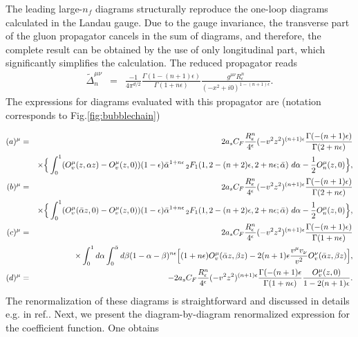 \documentclass[aps,prd,twocolumn,a4paper,superscriptaddress,10pt,showpacs,notitlepage,floatfix]{revtex4-1}
\begin{document}
The leading large-$n_f$ diagrams structurally reproduce the one-loop diagrams calculated in the Landau gauge. Due to the gauge invariance, the transverse part of the gluon propagator cancels in the sum of diagrams, and therefore, the complete result can be obtained by the use of only longitudinal part, which significantly simplifies the calculation. The reduced propagator reads
\begin{eqnarray}
\tilde \Delta_n^{\mu\nu}&=&\frac{-1}{4\pi^{d/2}}
\frac{\Gamma(1-(n+1)\epsilon)}{\Gamma(1+n\epsilon)}\frac{g^{\mu\nu} R_\epsilon^n}{(-x^2+i0)^{1-(n+1)\epsilon}}.
\end{eqnarray}
The expressions for diagrams evaluated with this propagator are (notation corresponds to Fig.\ref{fig:bubblechain})
\begin{widetext}
\begin{eqnarray}
(a)^\mu &=&2a_sC_F \frac{R_\epsilon^n}{4^\epsilon}(-v^2z^2)^{(n+1)\epsilon}\frac{\Gamma(-(n+1)\epsilon)}{\Gamma(2+n\epsilon)}
\\&& \nonumber \hfill
\times\Big\{\int_0^1  
(O_v^\mu(z,\alpha z)-O_v^\mu(z,0))(1-\epsilon)\bar \alpha^{1+n\epsilon}\,_2F_1(1,2-(n+2)\epsilon,2+n\epsilon;\bar \alpha)~d\alpha-\frac{1}{2}O^\mu_n(z,0)\Big\},
\\
(b)^\mu &=&2a_sC_F \frac{R_\epsilon^n}{4^\epsilon}(-v^2z^2)^{(n+1)\epsilon}\frac{\Gamma(-(n+1)\epsilon)}{\Gamma(2+n\epsilon)}
\\&& \nonumber \hfill
\times\Big\{\int_0^1  
(O_v^\mu(\bar \alpha z,0)-O_v^\mu(z,0))(1-\epsilon)\bar \alpha^{1+n\epsilon}\,_2F_1(1,2-(n+2)\epsilon,2+n\epsilon;\bar \alpha)~d\alpha-\frac{1}{2}O^\mu_n(z,0)\Big\},
\\
(c)^\mu &=&2a_sC_F \frac{R_\epsilon^n}{4^\epsilon}(-v^2z^2)^{(n+1)\epsilon}\frac{\Gamma(-(n+1)\epsilon)}{\Gamma(1+n\epsilon)}
\\&& \nonumber \hfill
\times\int_0^1  d\alpha \int_0^{\bar \alpha} d\beta (1-\alpha-\beta)^{n\epsilon}\Big[(1+n\epsilon)O_v^\mu(\bar \alpha z,\beta z)-2(n+1)\epsilon \frac{v^\mu v_\nu}{v^2}O^\nu_v(\bar \alpha z,\beta z)\Big],
\\
(d)^\mu &=&-2a_sC_F \frac{R_\epsilon^n}{4^\epsilon}(-v^2z^2)^{(n+1)\epsilon}\frac{\Gamma(-(n+1)\epsilon}{\Gamma(1+n\epsilon)}\frac{O^\mu_v(z,0)}{1-2(n+1)\epsilon}.
\end{eqnarray}
The renormalization of these diagrams is straightforward and discussed in details e.g. in ref.\cite{Beneke:1995pq}. Next, we present the diagram-by-diagram renormalized expression for the coefficient function. One obtains
\begin{eqnarray}\label{app:a}

\end{eqnarray}
\end{widetext}
\end{document}
